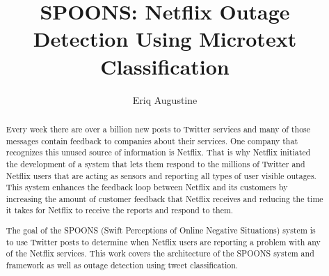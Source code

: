 \documentclass[12pt]{ucthesis}
\begin{document}

\title{SPOONS: Netflix Outage Detection Using Microtext Classification}
\author{Eriq Augustine}
  
 
      

\maketitle

\begin{frontmatter}

\copyrightpage

\committeemembershippage

\begin{abstract}

Every week there are over a billion new posts to Twitter services and many of
those messages contain feedback to companies about their services. One company
that recognizes this unused source of information is Netflix. That is why
Netflix initiated the development of a system that lets them respond to the
millions of Twitter and Netflix users that are acting as sensors and reporting all types of user
visible outages. This system enhances the feedback loop between Netflix and
its customers by increasing the amount of customer feedback that Netflix receives
and reducing the time it takes for Netflix to receive the reports and respond to them.

The goal of the SPOONS (Swift Perceptions of Online Negative Situations) system
is to use Twitter posts to determine when Netflix users are reporting a problem
with any of the Netflix services. This work covers the architecture of the SPOONS system and framework
as well as outage detection using tweet classification.

\end{abstract}

\begin{acknowledgements}


\end{acknowledgements}
\end{frontmatter}
\end{document}
